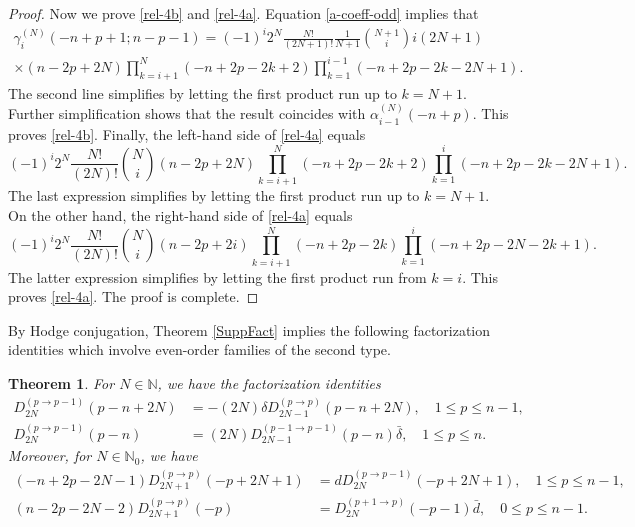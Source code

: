 \documentclass[a4paper,12pt,reqno]{amsart}
\newtheorem{theorem}{Theorem}
\numberwithin{theorem}{subsection}
\numberwithin{equation}{section}
\begin{document}
\begin{proof}
Now we prove \eqref{rel-4b} and \eqref{rel-4a}. Equation \eqref{a-coeff-odd}
implies that
\begin{multline*}
   \gamma_i^{(N)}(-n\!+\!p\!+\!1;n\!-\!p\!-\!1) = (-1)^i 2^N \frac{N!}{(2N\!+\!1)!}
   \frac{1}{N\!+\!1} \binom{N+1}{i} i (2N\!+\!1) \\ \times (n\!-\!2p\!+\!2N)
   \prod_{k=i+1}^N (-n\!+\!2p\!-\!2k\!+\!2) \prod_{k=1}^{i-1}
   (-n\!+\!2p\!-\!2k\!-\!2N\!+\!1).
\end{multline*}
The second line simplifies by letting the first product run up to $k=N+1$.
Further simplification shows that the result coincides with
$\alpha_{i-1}^{(N)}(-n\!+\!p)$. This proves \eqref{rel-4b}. Finally, the
left-hand side of \eqref{rel-4a} equals
\begin{equation*}
   (-1)^i 2^N \frac{N!}{(2N)!} \binom{N}{i} (n\!-\!2p\!+\!2N) \prod_{k=i+1}^N
   (-n\!+\!2p\!-\!2k\!+\!2) \prod_{k=1}^i (-n\!+\!2p\!-\!2k\!-\!2N\!+\!1).
\end{equation*}
The last expression simplifies by letting the first product run up to $k=N+1$.
On the other hand, the right-hand side of \eqref{rel-4a} equals
\begin{equation*}
   (-1)^i 2^N \frac{N!}{(2N)!} \binom{N}{i} (n\!-\!2p\!+\!2i) \prod_{k=i+1}^N
   (-n\!+\!2p\!-\!2k) \prod_{k=1}^i (-n\!+\!2p\!-\!2N\!-\!2k\!+\!1).
\end{equation*}
The latter expression simplifies by letting the first product run from $k=i$.
This proves \eqref{rel-4a}. The proof is complete.
\end{proof}

By Hodge conjugation, Theorem \ref{SuppFact} implies the following
factorization identities which involve even-order families of the second type.

\begin{theorem}\label{SuppFact-2} For $N \in {\mathbb{N}}$, we have the factorization identities
\begin{align*}
   D^{(p\to p-1)}_{2N}(p\!-\!n\!+\!2N) & = -(2N) \delta D^{(p \to p)}_{2N-1}(p\!-\!n\!+\!2N), \quad 1 \le p \le n-1, \\
   D^{(p\to p-1)}_{2N}(p\!-\!n) & = (2N)  D^{(p-1 \to p-1)}_{2N-1}(p\!-\!n) \bar{\delta}, \quad 1 \le p \le n.
\end{align*}
Moreover, for $N \in {\mathbb{N}}_0$, we have
\begin{align*}
   (-n\!+\!2p\!-\!2N\!-\!1) D^{(p \to p)}_{2N+1}(-p\!+\!2N\!+\!1) & =
   {d} D^{(p \to p-1)}_{2N}(-p\!+\!2N\!+\!1), \quad 1 \le p \le n-1,\\
   (n\!-\!2p\!-\!2N\!-\!2) D_{2N+1}^{(p \to p)}(-p) & = D_{2N}^{(p+1 \to p)}(-p\!-\!1) \bar{d},
   \quad 0 \le p \le n-1. \label{eq:supp1b}
\end{align*}
\end{theorem}
\end{document}
